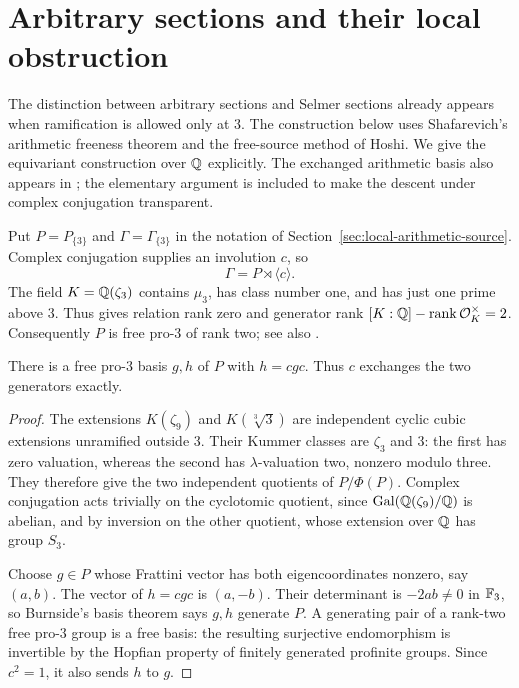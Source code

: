 \section{Arbitrary sections and their local obstruction}
\label{sec:arbitrary}

The distinction between arbitrary sections and Selmer sections already
appears when ramification is allowed only at $3$. The construction below
uses Shafarevich's arithmetic freeness theorem and the free-source method
of Hoshi. We give the equivariant construction over $\mathbb Q$ explicitly.
The exchanged arithmetic basis also appears in
\citet[Theorem 12, p.~12]{Medvedovsky2016}; the elementary argument is
included to make the descent under complex conjugation transparent.

Put $P=P_{\{3\}}$ and $\Gamma=\Gamma_{\{3\}}$ in the notation of
Section~\ref{sec:local-arithmetic-source}. Complex conjugation supplies an involution $c$, so
\[
\Gamma=P\rtimes\langle c\rangle.
\]
The field $K=\mathbb Q(\zeta_3)$ contains $\mu_3$, has class number one, and
has just one prime above $3$. Thus
\citet[\S4, example 1 after Theorem 5, p.~82]{Shafarevich1963}
gives relation rank zero and generator rank
$[K:\mathbb Q]-\operatorname{rank}\mathcal O_K^\times=2$.
Consequently $P$ is free pro-$3$ of rank two; see also
\citet[Lemma 3.2]{Hoshi2010}.

\begin{lemma}\label{lem:exchanged}
There is a free pro-$3$ basis $g,h$ of $P$ with $h=cgc$.
Thus $c$ exchanges the two generators exactly.
\end{lemma}
\begin{proof}
The extensions $K(\zeta_9)$ and $K(\sqrt[3]{3})$ are independent
cyclic cubic extensions unramified outside $3$. Their Kummer classes
are $\zeta_3$ and $3$: the first has zero valuation, whereas the
second has $\lambda$-valuation two, nonzero modulo three. They
therefore give the two independent quotients of $P/\Phi(P)$.
Complex conjugation acts trivially on the cyclotomic quotient,
since $\operatorname{Gal}(\mathbb Q(\zeta_9)/\mathbb Q)$ is abelian, and by inversion on the
other quotient, whose extension over $\mathbb Q$ has group $S_3$.

Choose $g\in P$ whose Frattini vector has both eigencoordinates
nonzero, say $(a,b)$. The vector of $h=cgc$ is $(a,-b)$.
Their determinant is $-2ab\ne0$ in $\mathbb F_3$, so Burnside's basis
theorem says $g,h$ generate $P$. A generating pair of a rank-two
free pro-$3$ group is a free basis: the resulting surjective
endomorphism is invertible by the Hopfian property of finitely
generated profinite groups. Since $c^2=1$, it also sends $h$ to $g$.
\end{proof}

